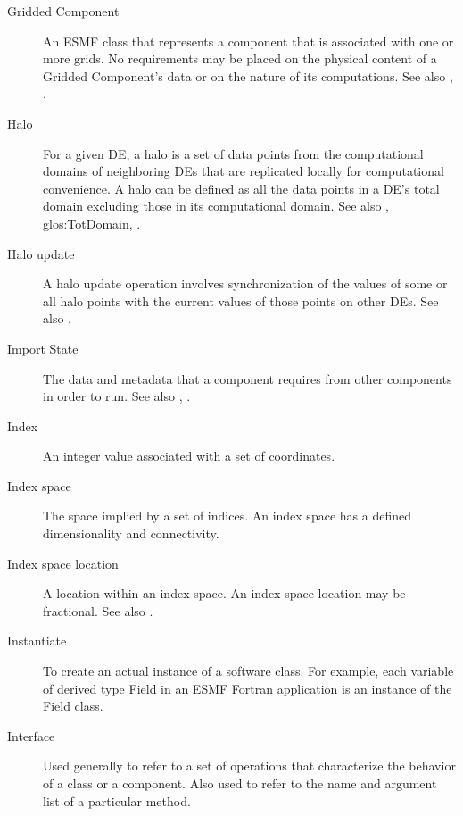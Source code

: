 \begin{description}
\label{glos:GridComp}
\item[Gridded Component] 
  An ESMF class that represents a component that is associated with one 
  or more grids.  No requirements 
  may be placed on the physical content of a Gridded Component's data or 
  on the nature of its computations. See also ,
  . 

\label{glos:Halo} 
\item[Halo] 
  For a given DE, a halo is a set of data points from the computational 
  domains of neighboring DEs that are replicated locally for computational
  convenience.  A halo can be defined as all the data points 
  in a DE's total domain excluding those in its computational domain. 
  See also , 
  {glos:TotDomain}, .

\label{glos:HaloUpdate}
\item[Halo update] 
  A halo update operation involves synchronization of the values of some 
  or all halo points with the current values of those points on other DEs.
  See also .

\label{glos:ImportState} 
\item[Import State] 
  The data and metadata 
  that a component requires from other components in order to run.  
  See also , .

\label{glos:Index} 
\item[Index] 
  An integer value associated with a set of coordinates.

\label{glos:IndexSpace} 
\item[Index space] 
  The space implied 
  by a set of indices.  An index space has a defined dimensionality and 
  connectivity.

\label{glos:IndexSpaceLoc} 
\item[Index space location] 
  A location within an index space.  An index space location may be fractional.
  See also .

\label{glos:Instantiate}
\item[Instantiate] 
  To create an actual instance of a software class.  For example, each 
  variable of derived type Field in an ESMF Fortran application is an 
  instance of the Field class.

\label{glos:Interface}
\item[Interface] 
  Used generally to refer to a set of operations that characterize 
  the behavior of a class or a component.  Also used to refer to the
  name and argument list of a particular method.


\end{description}
